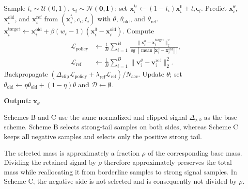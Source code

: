 \begin{algorithm}[H]
\begin{algorithmic}[1]
                \State Sample $t_i\sim\mathcal{U}(0,1)$,
                $\boldsymbol{\epsilon}_i\sim\mathcal{N}(\mathbf{0},\mathbf{I})$;
                set $\mathbf{x}_i^{t_i}\leftarrow
                (1-t_i)\mathbf{x}_i^0+t_i\boldsymbol{\epsilon}_i$.
                \State Predict $\mathbf{x}_i^\theta$,
                $\mathbf{x}_i^{\mathrm{old}}$, and $\mathbf{x}_i^{\mathrm{ref}}$
                from $(\mathbf{x}_i^{t_i},c_i,t_i)$ with
                $\theta$, $\theta_{\mathrm{old}}$, and $\theta_{\mathrm{ref}}$.
                \State $\mathbf{x}_i^{\mathrm{target}}\leftarrow
                \mathbf{x}_i^{\mathrm{old}}+
                \beta(w_i-1)(\mathbf{x}_i^0-\mathbf{x}_i^{\mathrm{old}})$.
                \State Compute
                \[
                    \begin{aligned}
                    \mathcal{L}_{\mathrm{policy}}
                    &\leftarrow\frac{1}{B}\sum_{i=1}^{B}
                    \frac{\|\mathbf{x}_i^\theta-\mathbf{x}_i^{\mathrm{target}}\|_2^2}
                    {\operatorname{sg}[\operatorname{mean}
                    |\mathbf{x}_i^0-\mathbf{x}_i^{\mathrm{old}}|]},\\
                    \mathcal{L}_{\mathrm{ref}}
                    &\leftarrow\frac{1}{B}\sum_{i=1}^{B}
                    \|\mathbf{v}_i^\theta-\mathbf{v}_i^{\mathrm{ref}}\|_2^2.
                    \end{aligned}
                \]
                \State Backpropagate
                $(\Delta_{\mathrm{clip}}\mathcal{L}_{\mathrm{policy}}+
                \lambda_{\mathrm{ref}}\mathcal{L}_{\mathrm{ref}})/N_{\mathrm{acc}}$.
            \EndFor
            \State Update $\theta$; set
            $\theta_{\mathrm{old}}\leftarrow
            \eta\theta_{\mathrm{old}}+(1-\eta)\theta$ and
            $\mathcal{D}\leftarrow\emptyset$.
        \EndFor
    \end{algorithmic}
    \textbf{Output:} $\mathbf{x}_\theta$
\end{algorithm}



Schemes B and C use the same normalized and clipped signal
$\Delta_{j,k}$ as the base scheme.  Scheme B selects strong-tail samples on
both sides, whereas Scheme C keeps all negative samples and selects only the
positive strong tail.

The selected mass is approximately a fraction $\rho$ of the corresponding
base mass.  Dividing the retained signal by $\rho$ therefore approximately
preserves the total mass while reallocating it from
borderline samples to strong signal samples.  In Scheme C, the negative side is not
selected and is consequently not divided by $\rho$.

